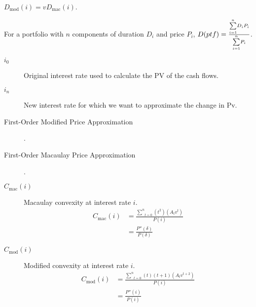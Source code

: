 \documentclass[10pt, french]{article}
\begin{document}
\begin{multicols*}{2}
\begin{definitionNOHFILLsub}[Duration]
\tcbline

$D_{\text{mod}}(i)	=	vD_{\text{mac}}(i)$.
\end{definitionNOHFILLsub}

For a portfolio with $n$ components of duration $D_{i}$ and price $P_{i}$, $D(ptf)	=	\frac{\overset{n}{\underset{i = 1}{\sum}}D_{i}P_{i}}{\overset{n}{\underset{i = 1}{\sum}}P_{i}}$.


\begin{definitionNOHFILLprop}[Approximations]
\begin{distributions}[Notation]
\begin{description}
	\item[$i_{0}$]	Original interest rate used to calculate the PV of the cash flows.
	\item[$i_{n}$]	New interest rate for which we want to approximate the change in Pv.
\end{description}
\end{distributions}
\begin{description}
	\item[First-Order Modified Price Approximation]	.
	\item[First-Order Macaulay Price Approximation]	.
\end{description}
\end{definitionNOHFILLprop}

\begin{definitionNOHFILLsub}[Convexity]
\begin{description}
	\item[$C_{\text{mac}}(i)$]	Macaulay convexity at interest rate $i$.
		\begin{align*}
		C_{\text{mac}}(i)
		&=	\frac{\underset{t = 0}{\overset{n}{\sum}} (t^{2}) (A_{t}v^{t})}{P(i)}	\\
		&=	\frac{P''(\delta)}{P(\delta)}	
		\end{align*}
	\item[$C_{\text{mod}}(i)$]	Modified convexity at interest rate $i$.
		\begin{align*}
		C_{\text{mod}}(i)
		&=	\frac{\underset{t = 0}{\overset{n}{\sum}} (t) (t + 1) (A_{t}v^{t + 2})}{P(i)}	\\
		&=	\frac{P''(i)}{P(i)}	
		\end{align*}
\end{description}

\tcbline


\end{definitionNOHFILLsub}
\end{multicols*}
\end{document}
